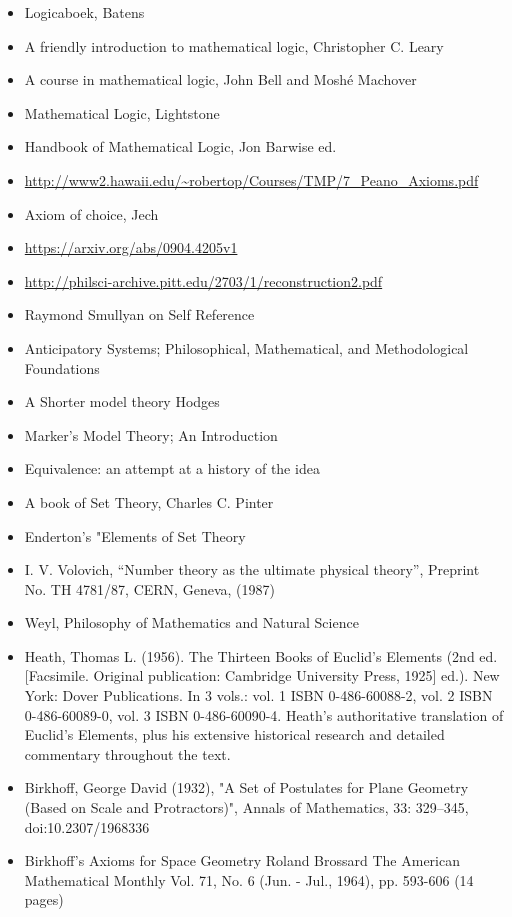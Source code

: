 \documentclass{report}
\begin{document}
\begin{itemize}
\item Logicaboek, Batens
\item A friendly introduction to mathematical logic, Christopher C. Leary
\item A course in mathematical logic, John Bell and Moshé Machover
\item Mathematical Logic, Lightstone
\item Handbook of Mathematical Logic, Jon Barwise ed.
\item \url{http://www2.hawaii.edu/~robertop/Courses/TMP/7_Peano_Axioms.pdf}
\item Axiom of choice, Jech
\item \url{https://arxiv.org/abs/0904.4205v1}
\item \url{http://philsci-archive.pitt.edu/2703/1/reconstruction2.pdf}
\item Raymond Smullyan on Self Reference
\item Anticipatory Systems; Philosophical, Mathematical, and Methodological Foundations
\item A Shorter model theory Hodges
\item Marker's Model Theory; An Introduction
\item Equivalence: an attempt at a history of the idea
\item A book of Set Theory, Charles C. Pinter
\item Enderton's "Elements of Set Theory
\item I. V. Volovich, ``Number theory as the ultimate physical theory'', Preprint No. TH 4781/87, CERN, Geneva, (1987)
\item Weyl, Philosophy of Mathematics and Natural Science
\item Heath, Thomas L. (1956). The Thirteen Books of Euclid's Elements (2nd ed. [Facsimile. Original publication: Cambridge University Press, 1925] ed.). New York: Dover Publications. In 3 vols.: vol. 1 ISBN 0-486-60088-2, vol. 2 ISBN 0-486-60089-0, vol. 3 ISBN 0-486-60090-4. Heath's authoritative translation of Euclid's Elements, plus his extensive historical research and detailed commentary throughout the text.
\item Birkhoff, George David (1932), "A Set of Postulates for Plane Geometry (Based on Scale and Protractors)", Annals of Mathematics, 33: 329–345, doi:10.2307/1968336
\item Birkhoff's Axioms for Space Geometry
Roland Brossard
The American Mathematical Monthly
Vol. 71, No. 6 (Jun. - Jul., 1964), pp. 593-606 (14 pages)

\end{itemize}
\end{document}
